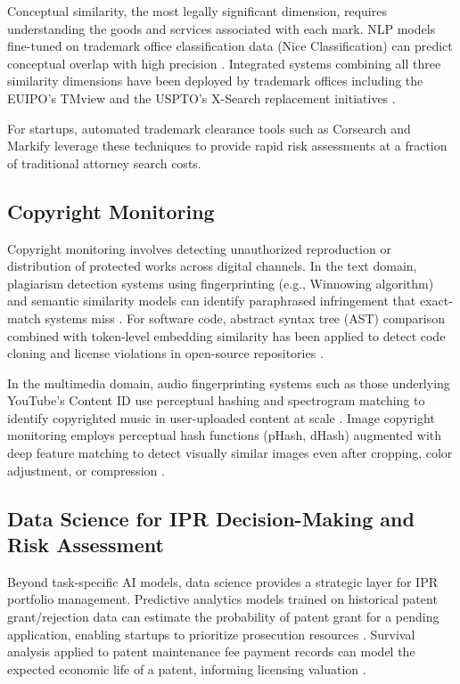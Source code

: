 \documentclass[conference]{IEEEtran}
\begin{document}
Conceptual similarity, the most legally significant dimension, requires understanding the goods and services associated with each mark. NLP models fine-tuned on trademark office classification data (Nice Classification) can predict conceptual overlap with high precision \cite{ref29}. Integrated systems combining all three similarity dimensions have been deployed by trademark offices including the EUIPO's TMview and the USPTO's X-Search replacement initiatives \cite{ref4}.

For startups, automated trademark clearance tools such as Corsearch and Markify leverage these techniques to provide rapid risk assessments at a fraction of traditional attorney search costs.

\subsection{Copyright Monitoring}

Copyright monitoring involves detecting unauthorized reproduction or distribution of protected works across digital channels. In the text domain, plagiarism detection systems using fingerprinting (e.g., Winnowing algorithm) and semantic similarity models can identify paraphrased infringement that exact-match systems miss \cite{ref30}. For software code, abstract syntax tree (AST) comparison combined with token-level embedding similarity has been applied to detect code cloning and license violations in open-source repositories \cite{ref31}.

In the multimedia domain, audio fingerprinting systems such as those underlying YouTube's Content ID use perceptual hashing and spectrogram matching to identify copyrighted music in user-uploaded content at scale \cite{ref32}. Image copyright monitoring employs perceptual hash functions (pHash, dHash) augmented with deep feature matching to detect visually similar images even after cropping, color adjustment, or compression \cite{ref33}.

\subsection{Data Science for IPR Decision-Making and Risk Assessment}

Beyond task-specific AI models, data science provides a strategic layer for IPR portfolio management. Predictive analytics models trained on historical patent grant/rejection data can estimate the probability of patent grant for a pending application, enabling startups to prioritize prosecution resources \cite{ref34}. Survival analysis applied to patent maintenance fee payment records can model the expected economic life of a patent, informing licensing valuation \cite{ref35}.
\end{document}
